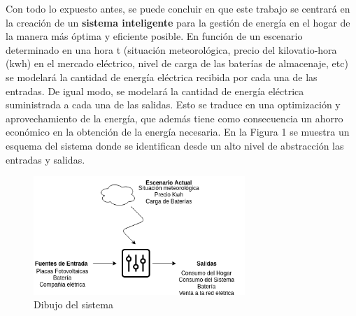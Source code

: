 Con todo lo expuesto antes, se puede concluir en que este trabajo se centrará en la creación de un \textbf{sistema inteligente} para la gestión de energía en el hogar de la manera más óptima y eficiente posible. En función de un escenario determinado en una hora t (situación meteorológica, precio del kilovatio-hora (kwh) en el mercado eléctrico, nivel de carga de las baterías de almacenaje, etc) se modelará la cantidad de energía eléctrica recibida por cada una de las entradas. De igual modo, se modelará la cantidad de energía eléctrica suministrada a cada una de las salidas. Esto se traduce en una optimización y aprovechamiento de la energía, que además tiene como consecuencia un ahorro económico en la obtención de la energía necesaria.
En la Figura 1 se muestra un esquema del sistema donde se identifican desde un alto nivel de abstracción las entradas y salidas.\\

\begin{figure}[!h]
	\centering
	\includegraphics[width=8cm]{figs/Abstract.png}
	\caption{Dibujo del sistema}
\end{figure}

